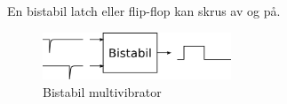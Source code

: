 En bistabil latch eller flip-flop kan skrus av og på.

\begin{figure}[H]
  \centering
  \includegraphics[width=0.5\textwidth]{./img/bistabil}
  \caption{Bistabil multivibrator}
\end{figure}
